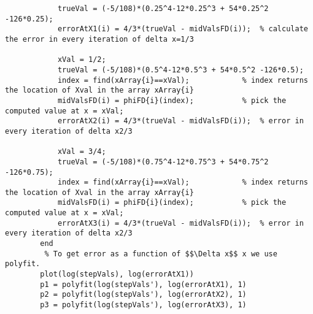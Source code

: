 \documentclass{article}
\begin{document}
\begin{lstlisting}
            trueVal = (-5/108)*(0.25^4-12*0.25^3 + 54*0.25^2 -126*0.25);
            errorAtX1(i) = 4/3*(trueVal - midValsFD(i));  % calculate the error in every iteration of delta x=1/3
            
            xVal = 1/2;
            trueVal = (-5/108)*(0.5^4-12*0.5^3 + 54*0.5^2 -126*0.5);
            index = find(xArray{i}==xVal);            % index returns the location of Xval in the array xArray{i}
            midValsFD(i) = phiFD{i}(index);           % pick the computed value at x = xVal; 
            errorAtX2(i) = 4/3*(trueVal - midValsFD(i));  % error in every iteration of delta x2/3

            xVal = 3/4;
            trueVal = (-5/108)*(0.75^4-12*0.75^3 + 54*0.75^2 -126*0.75);
            index = find(xArray{i}==xVal);            % index returns the location of Xval in the array xArray{i}
            midValsFD(i) = phiFD{i}(index);           % pick the computed value at x = xVal; 
            errorAtX3(i) = 4/3*(trueVal - midValsFD(i));  % error in every iteration of delta x2/3
        end
         % To get error as a function of $$\Delta x$$ x we use polyfit.
        plot(log(stepVals), log(errorAtX1))
        p1 = polyfit(log(stepVals'), log(errorAtX1), 1)
        p2 = polyfit(log(stepVals'), log(errorAtX2), 1)
        p3 = polyfit(log(stepVals'), log(errorAtX3), 1)


    \end{lstlisting}
    
        

     

    
\end{document}
